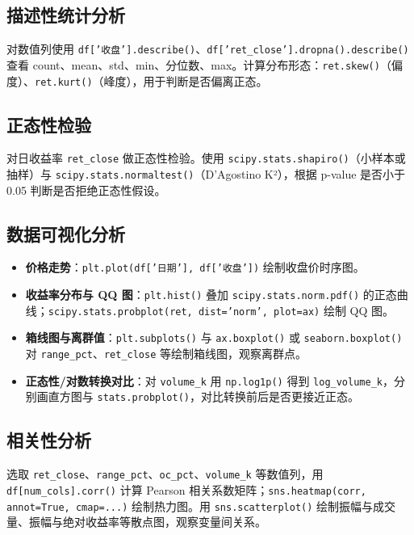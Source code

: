 \documentclass[12pt,a4paper]{article}
\begin{document}
\subsection{描述性统计分析}
对数值列使用 \texttt{df['收盘'].describe()}、\texttt{df['ret\_close'].dropna().describe()} 查看 count、mean、std、min、分位数、max。计算分布形态：\texttt{ret.skew()}（偏度）、\texttt{ret.kurt()}（峰度），用于判断是否偏离正态。

\subsection{正态性检验}
对日收益率 \texttt{ret\_close} 做正态性检验。使用 \texttt{scipy.stats.shapiro()}（小样本或抽样）与 \texttt{scipy.stats.normaltest()}（D'Agostino K²），根据 p-value 是否小于 0.05 判断是否拒绝正态性假设。

\subsection{数据可视化分析}
\begin{itemize}[leftmargin=*]
    \item \textbf{价格走势}：\texttt{plt.plot(df['日期'], df['收盘'])} 绘制收盘价时序图。
    \item \textbf{收益率分布与 QQ 图}：\texttt{plt.hist()} 叠加 \texttt{scipy.stats.norm.pdf()} 的正态曲线；\texttt{scipy.stats.probplot(ret, dist='norm', plot=ax)} 绘制 QQ 图。
    \item \textbf{箱线图与离群值}：\texttt{plt.subplots()} 与 \texttt{ax.boxplot()} 或 \texttt{seaborn.boxplot()} 对 \texttt{range\_pct}、\texttt{ret\_close} 等绘制箱线图，观察离群点。
    \item \textbf{正态性/对数转换对比}：对 \texttt{volume\_k} 用 \texttt{np.log1p()} 得到 \texttt{log\_volume\_k}，分别画直方图与 \texttt{stats.probplot()}，对比转换前后是否更接近正态。
\end{itemize}

\subsection{相关性分析}
选取 \texttt{ret\_close}、\texttt{range\_pct}、\texttt{oc\_pct}、\texttt{volume\_k} 等数值列，用 \texttt{df[num\_cols].corr()} 计算 Pearson 相关系数矩阵；\texttt{sns.heatmap(corr, annot=True, cmap=...)} 绘制热力图。用 \texttt{sns.scatterplot()} 绘制振幅与成交量、振幅与绝对收益率等散点图，观察变量间关系。
\end{document}
